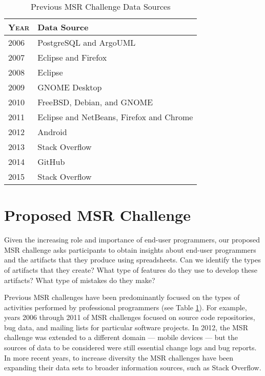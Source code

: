 \documentclass[conference]{IEEEtran}
\begin{document}
\begin{table}[!t]
\caption{Previous MSR Challenge Data Sources\label{tab:datasources}}
\centering
\begin{tabular}{ll}
\toprule
\textbf{\textsc{Year}} & \textbf{Data Source}\\
\midrule
2006 & PostgreSQL and ArgoUML\\
2007 & Eclipse and Firefox\\
2008 & Eclipse\\
2009 & GNOME Desktop\\
2010 & FreeBSD, Debian, and GNOME\\
2011 & Eclipse and NetBeans, Firefox and Chrome\\
2012 & Android\\
2013 & Stack Overflow\\
2014 & GitHub\\
2015 & Stack Overflow\\
\bottomrule
\end{tabular}
\end{table}

\section{Proposed MSR Challenge}

Given the increasing role and importance of end-user programmers, our proposed MSR challenge asks participants to obtain insights about end-user programmers and the artifacts that they produce using spreadsheets. Can we identify the types of artifacts that they create? What type of features do they use to develop these artifacts? What type of mistakes do they make?

Previous MSR challenges have been predominantly focused on the types of activities performed by professional programmers (see Table \ref{tab:datasources}). For example, years 2006 through 2011 of MSR challenges focused on source code repositories, bug data, and mailing lists for particular software projects. In 2012, the MSR challenge was extended to a different domain --- mobile devices --- but the sources of data to be considered were still essential change logs and bug reports. In more recent years, to increase diversity the MSR challenges have been expanding their data sets to broader information sources, such as Stack Overflow.
\end{document}
